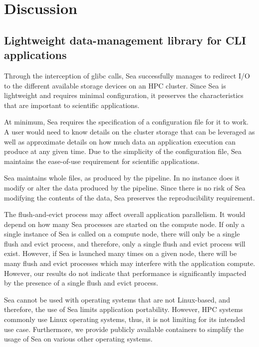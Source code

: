 \documentclass[10pt,journal,compsoc]{IEEEtran}
\begin{document}
\section{Discussion}

    \subsection{Lightweight data-management library for CLI applications}

    Through the interception of glibc calls, Sea successfully manages to
    redirect I/O to the different available storage devices on an HPC cluster.
    Since Sea is lightweight and requires minimal configuration, it preserves
    the characteristics that are important to scientific applications.

    At minimum, Sea requires the specification of a configuration file for it to
    work. A user would need to know details on the cluster storage that can be
    leveraged as well as approximate details on how much data an application
    execution can produce at any given time. Due to the simplicity of the
    configuration file, Sea maintains the ease-of-use requirement for scientific
    applications.

    Sea maintains whole files, as produced by the pipeline. In no instance does
    it modify or alter the data produced by the pipeline. Since there is no risk
    of Sea modifying the contents of the data, Sea preserves the reproducibility
    requirement.

    The flush-and-evict process may affect overall application parallelism. It
    would depend on how many Sea processes are started on the compute node. If
    only a single instance of Sea is called on a compute node, there will only
    be a single flush and evict process, and therefore, only a single flush and
    evict process will exist. However, if Sea is launched many times on a given
    node, there will be many flush and evict processes which may interfere with
    the application compute. However, our results do not indicate that
    performance is significantly impacted by the presence of a single flush and
    evict process.  

    Sea cannot be used with operating systems that are not Linux-based, and
    therefore, the use of Sea limits application portability. However, HPC
    systems commonly use Linux operating systems, thus, it is not limiting for
    its intended use case. Furthermore, we provide publicly available containers
    to simplify the usage of Sea on various other operating systems.
\end{document}
